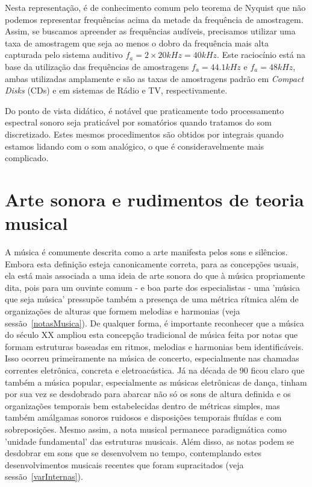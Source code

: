 Nesta representação, é de conhecimento comum pelo teorema de Nyquist que não podemos representar frequências acima da metade da frequência de amostragem. Assim, se buscamos apreender as frequências audíveis, precisamos utilizar uma taxa de amostragem que seja ao menos o dobro da frequência mais alta capturada pelo sistema auditivo $f_a=2\times 20kHz=40kHz$. Este raciocínio está na base da utilização das frequências de amostragens $f_a=44.1kHz$ e $f_a=48kHz$, ambas utilizadas amplamente e são as taxas de amostragens padrão em \emph{Compact Disks} (CDs) e em sistemas de Rádio e TV, respectivamente.

Do ponto de vista didático, é notável que praticamente todo processamento espectral sonoro seja praticável por somatórios quando tratamos do som discretizado. Estes mesmos procedimentos são obtidos por integrais quando estamos lidando com o som analógico, o que é consideravelmente mais complicado.




    \section{Arte sonora e rudimentos de teoria musical}

A música é comumente descrita como a arte manifesta pelos sons e silêncios. Embora esta definição esteja canonicamente correta, para as concepções usuais, ela está mais associada a uma ideia de arte sonora do que à música propriamente dita, pois para um ouvinte comum - e boa parte dos especialistas - uma 'música que seja música' pressupõe também a presença de uma métrica rítmica além de organizações de alturas que formem melodias e harmonias (veja sessão~\ref{notasMusica}). De qualquer forma, é importante reconhecer que a música do século XX ampliou esta concepção tradicional de música feita por notas que formam estruturas baseadas em ritmos, melodias e harmonias bem identificáveis. Isso ocorreu primeiramente na música de concerto, especialmente nas chamadas correntes eletrônica, concreta e eletroacústica. Já na década de 90 ficou claro que também a música popular, especialmente as músicas eletrônicas de dança, tinham por sua vez se desdobrado para abarcar não só os sons de altura definida e os organizações temporais bem estabelecidas dentro de métricas simples, mas também amálgamas sonoros ruidosos e disposições temporais fluídas e com sobreposições. Mesmo assim, a nota musical permanece paradigmática como 'unidade fundamental' das estruturas musicais. Além disso, as notas podem se desdobrar em sons que se desenvolvem no tempo, contemplando estes desenvolvimentos musicais recentes que foram supracitados (veja sessão~\ref{varInternas}).

